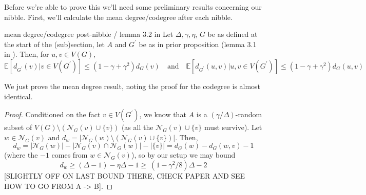 \documentclass{article}
\begin{document}
Before we're able to prove this we'll need some preliminary results concerning our nibble. First, we'll calculate the 
mean degree/codegree after each nibble. 

\begin{lemma}[]{mean degree/codegree post-nibble / lemma 3.2 in \cite{campos2023}}
    Let $\Delta, \gamma, \eta$, $G$ be as defined at the start of the (sub)section, let $A$ and $G^\prime$ be as in 
    prior proposition (lemma 3.1 in \cite{campos2023}). Then, for $u, v \in V(G)$, 
    \[\mathbb{E}[d_{G^\prime}(v) | v \in V(G^\prime)] \leq (1 - \gamma + \gamma^2)d_G(v) \quad \text{and} \quad
    \mathbb{E}[d_{G^\prime}(u, v) | u, v \in V(G^\prime)] \leq (1 - \gamma + \gamma^2)d_G(u, v)\]
\end{lemma}

We just prove the mean degree result, noting the proof for the codegree is almost identical.

\begin{proof}
     Conditioned on the fact $v \in V(G^\prime)$, we know that $A$ is a $(\gamma/\Delta)$-random subset of 
     $V(G) \setminus (\mathcal{N}_G(v) \cup \{v\})$ (as all the $\mathcal{N}_G(v) \cup \{v\}$ must survive). 
     Let $w \in \mathcal{N}_G(v)$ and $d_w = |\mathcal{N}_G(w) \setminus (\mathcal{N}_G(v) \cup \{v\})|$. 
     Then, \[d_w = |\mathcal{N}_G(w)| - |\mathcal{N}_G(v) \cap \mathcal{N}_G(w)| - |\{v\}| 
     = d_G(w) - d_G(w, v) - 1\]
     (where the $-1$ comes from $w \in \mathcal{N}_G(v)$), so by our setup we may bound 
     \[d_w \geq (\Delta - 1) - \eta\Delta - 1 \geq \ (1 - \gamma^2/8)\Delta - 2\]
     [SLIGHTLY OFF ON LAST BOUND THERE, CHECK PAPER AND SEE HOW TO GO FROM A -> B].
\end{proof}
\newpage


 
\end{document}
